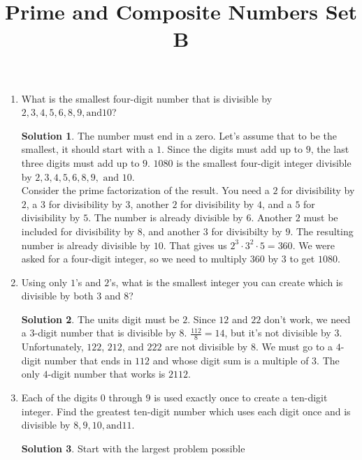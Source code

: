 \documentclass[twocolumn]{article}
\title{Prime and Composite Numbers Set B}
\date{}
\author{}
\theoremstyle{definition}
\newtheorem*{solution}{Solution}
\begin{document}
\maketitle
\begin{enumerate}
    \item What is the smallest four-digit number that is divisible by $2, 3, 4, 5,
        6, 8, 9, \textrm{and} 10$?
        \begin{solution}
            The number must end in a zero. Let's assume that to be the smallest, it should
            start with a $1$. Since the digits must add up to $9$, the last three digits
            must add up to $9$. $1080$ is the smallest four-digit integer divisible
            by $2, 3, 4, 5, 6, 8, 9, \text{ and } 10$. \\
            Consider the prime factorization of the result. You need a $2$ for divisibility
            by $2$, a $3$ for divisibility by $3$, another $2$ for divisibility by $4$,
            and a $5$ for divisibility by $5$. The number is already divisible by $6$.
            Another $2$ must be included for divisibility by $8$, and another $3$ for
            divisibilty by $9$. The resulting number is already divisible by $10$.
            That gives us $2^3 \cdot 3^2 \cdot 5 = 360$. We were asked for a four-digit
            integer, so we need to multiply $360$ by $3$ to get $1080$.
        \end{solution}
    \item Using only $1$'s and $2$'s, what is the smallest integer you can create
        which is divisible by both $3$ and $8$?
        \begin{solution}
            The units digit must be $2$. Since $12$ and $22$ don't work, we need a
            $3$-digit number that is divisible by $8$. $\frac{112}{8} = 14$, but it's
            not divisible by $3$. Unfortunately, $122$, $212$, and $222$ are not divisible
            by $8$. We must go to a $4$-digit number that ends in $112$ and whose digit
            sum is a multiple of $3$. The only $4$-digit number that works is $2112$.
        \end{solution}
    \item Each of the digits $0$ through $9$ is used exactly once to create a ten-digit
        integer. Find the greatest ten-digit number which uses each digit once and is
        divisible by $8, 9, 10, \textrm{and} 11$.
        \begin{solution}
            Start with the largest problem possible \\

\end{solution}
\end{enumerate}
\end{document}
